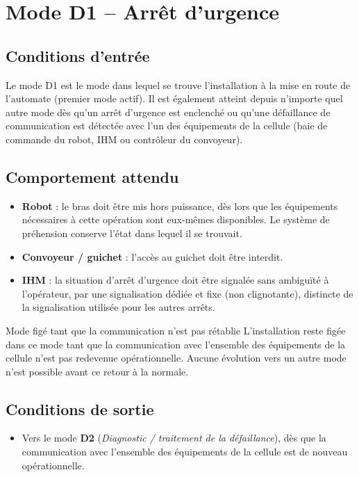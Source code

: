 \section{Mode D1 -- Arrêt d'urgence}
\label{secModeD1}

\subsection{Conditions d'entrée}

Le mode D1 est le mode dans lequel se trouve l'installation à la mise en
route de l'automate (premier mode actif). Il est également atteint depuis
n'importe quel autre mode dès qu'un arrêt d'urgence est enclenché ou 
qu'une défaillance de communication est
détectée avec l'un des équipements de la cellule (baie de commande du
robot, IHM ou contrôleur du convoyeur).

\subsection{Comportement attendu}

\begin{itemize}
    \item \textbf{Robot} : le bras doit être mis hors puissance, dès lors
    que les équipements nécessaires à cette opération sont eux-mêmes
    disponibles. Le système de préhension conserve l'état dans lequel il
    se trouvait.
    \item \textbf{Convoyeur / guichet} : l'accès au guichet doit être
    interdit.
    \item \textbf{IHM} : la situation d'arrêt d'urgence doit être signalée
    sans ambiguïté à l'opérateur, par une signalisation dédiée et fixe
    (non clignotante), distincte de la signalisation utilisée pour les
    autres arrêts.
\end{itemize}

\begin{UPSTIwarning}{Mode figé tant que la communication n'est pas rétablie}
L'installation reste figée dans ce mode tant que la communication avec
l'ensemble des équipements de la cellule n'est pas redevenue opérationnelle.
Aucune évolution vers un autre mode n'est possible avant ce retour à la
normale.
\end{UPSTIwarning}

\subsection{Conditions de sortie}

\begin{itemize}
    \item Vers le mode \textbf{D2} (\emph{Diagnostic / traitement de la
    défaillance}), dès que la communication avec l'ensemble des
    équipements de la cellule est de nouveau opérationnelle.
\end{itemize}
